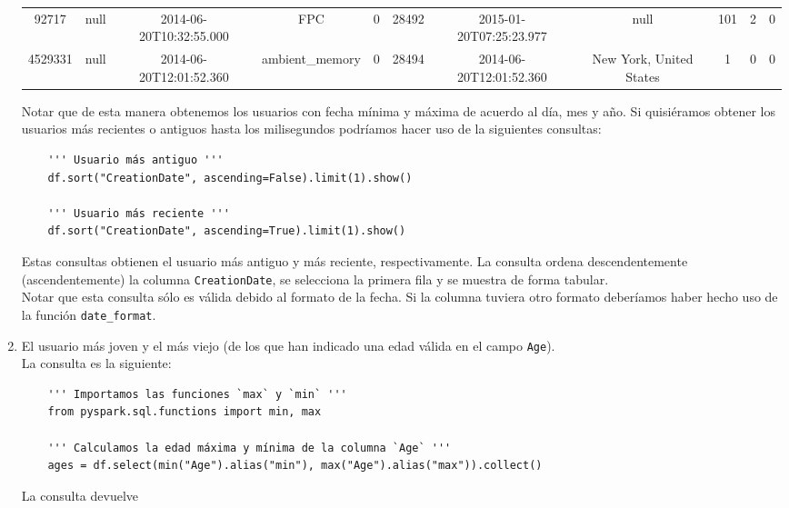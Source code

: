 \documentclass[12pt,a4paper,twoside,openright,titlepage,final]{article}
\begin{document}
\begin{enumerate}
\begin{table}[htbp!]
{\begin{tabular}{@{}ccccccccccc@{}}
			92717     & null & 2014-06-20T10:32:55.000 & FPC                   & 0         & 28492 & 2015-01-20T07:25:23.977 & null                             & 101        & 2       & 0     \\
			4529331   & null & 2014-06-20T12:01:52.360 & ambient\_memory       & 0         & 28494 & 2014-06-20T12:01:52.360 & New York, United States          & 1          & 0       & 0     \\ \bottomrule
			\end{tabular}
		}
	\end{table}
	
	Notar que de esta manera obtenemos los usuarios con fecha  mínima y máxima de acuerdo al día, mes y año. Si quisiéramos obtener los usuarios más recientes o antiguos hasta los milisegundos podríamos hacer uso de la siguientes consultas: 
	
	\begin{verbatim}
	''' Usuario más antiguo '''
	df.sort("CreationDate", ascending=False).limit(1).show()
	
	''' Usuario más reciente '''
	df.sort("CreationDate", ascending=True).limit(1).show()
	\end{verbatim}
	
	Estas consultas obtienen el usuario más antiguo y más reciente, respectivamente. La consulta ordena descendentemente (ascendentemente) la columna \texttt{CreationDate}, se selecciona la primera fila y se muestra de forma tabular.\\
	
	Notar que esta consulta sólo es válida debido al formato de la fecha. Si la columna tuviera otro formato deberíamos haber hecho uso de la función \texttt{date\_format}.  
	
	\item El usuario más joven y el más viejo (de los que han indicado una edad válida en el campo \texttt{Age}).\\
	
	La consulta es la siguiente:
	
	\begin{verbatim}
	''' Importamos las funciones `max` y `min` '''
	from pyspark.sql.functions import min, max
	
	''' Calculamos la edad máxima y mínima de la columna `Age` '''
	ages = df.select(min("Age").alias("min"), max("Age").alias("max")).collect()
	\end{verbatim}
	
	La consulta devuelve 
	

\end{enumerate}
\end{document}
